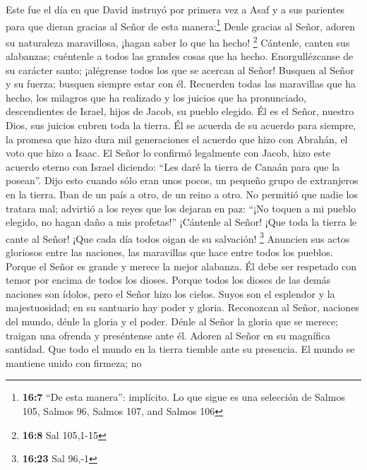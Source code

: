  Este fue el día en que David instruyó por primera vez a
Asaf y a sus parientes para que dieran gracias al Señor de esta
manera:\footnote{\textbf{16:7} ``De esta manera'': implícito. Lo que
  sigue es una selección de Salmos 105, Salmos 96, Salmos 107, and
  Salmos 106}  Denle gracias al Señor, adoren su
naturaleza maravillosa, ¡hagan saber lo que ha hecho! \footnote{\textbf{16:8}
  Sal 105,1-15}  Cántenle, canten sus alabanzas; cuéntenle
a todos las grandes cosas que ha hecho.  Enorgullézcanse
de su carácter santo; ¡alégrense todos los que se acercan al Señor!
 Busquen al Señor y su fuerza; busquen siempre estar con
él.  Recuerden todas las maravillas que ha hecho, los
milagros que ha realizado y los juicios que ha pronunciado,
 descendientes de Israel, hijos de Jacob, su pueblo
elegido.  Él es el Señor, nuestro Dios, sus juicios
cubren toda la tierra.  Él se acuerda de su acuerdo para
siempre, la promesa que hizo dura mil generaciones  el
acuerdo que hizo con Abrahán, el voto que hizo a Isaac. 
El Señor lo confirmó legalmente con Jacob, hizo este acuerdo eterno con
Israel  diciendo: ``Les daré la tierra de Canaán para que
la posean''.  Dijo esto cuando sólo eran unos pocos, un
pequeño grupo de extranjeros en la tierra.  Iban de un
país a otro, de un reino a otro.  No permitió que nadie
los tratara mal; advirtió a los reyes que los dejaran en paz:
 ``¡No toquen a mi pueblo elegido, no hagan daño a mis
profetas!''  ¡Cántenle al Señor! ¡Que toda la tierra le
cante al Señor! ¡Que cada día todos oigan de su salvación! \footnote{\textbf{16:23}
  Sal 96,-1}  Anuncien sus actos gloriosos entre las
naciones, las maravillas que hace entre todos los pueblos.
 Porque el Señor es grande y merece la mejor alabanza. Él
debe ser respetado con temor por encima de todos los dioses.
 Porque todos los dioses de las demás naciones son
ídolos, pero el Señor hizo los cielos.  Suyos son el
esplendor y la majestuosidad; en su santuario hay poder y gloria.
 Reconozcan al Señor, naciones del mundo, dénle la gloria
y el poder.  Dénle al Señor la gloria que se merece;
traigan una ofrenda y preséntense ante él. Adoren al Señor en su
magnífica santidad.  Que todo el mundo en la tierra
tiemble ante su presencia. El mundo se mantiene unido con firmeza; no
